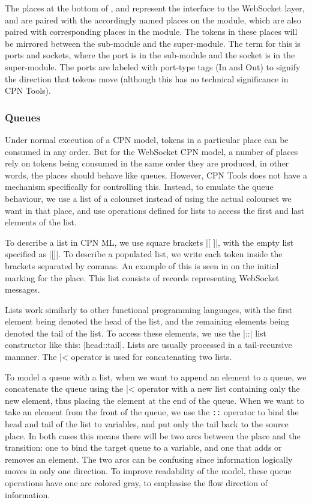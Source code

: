 	The places at the bottom of ,  and
	  represent the interface to the WebSocket layer, and
	are paired with the accordingly named places on the  module,
	which are also paired with corresponding places in the  module. The tokens in these places will be mirrored between the
	sub-module and the super-module. The term for this is ports and sockets,
	where the port is in the sub-module and the socket is in the super-module. The
	ports are labeled with port-type tags (In and Out) to signify the direction
	that tokens move (although this has no technical significance in CPN Tools).
	
	
	\subsubsection{Queues}
	
		Under normal execution of a CPN model, tokens in a particular place can be
		consumed in any order. But for the WebSocket CPN model, a number of places
		rely on tokens being consumed in the same order they are produced,
		in other words, the places should behave like queues. 
		However, CPN Tools does not have a mechanism specifically for controlling
		this.
		Instead, to emulate the queue behaviour, we use a list of a colourset
		instead of using the actual colourset we want in that place, and use
		operations defined for lists to access the first and last elements of the
		list. 
		
		To describe a list in CPN ML, we use square brackets |[ ]|, with the empty
		list specified as |[]|. To describe a populated list, we write each token
		inside the brackets separated by commas. An example of this is seen in
		 on the initial marking for the 
		place. This list consists of records representing WebSocket messages.
		
		Lists work similarly to other functional programming languages, with the
		first element being denoted the head of the list, and the remaining elements
		being denoted the tail of the list. To access these elements, we use the |::|
		list constructor like this: |head::tail|. Lists are usually processed in a
		tail-recursive mannner. The |^^| operator is used for concatenating two lists.
		
		To model a queue with a list, when we want to append an
		element to a queue, we concatenate the queue using the |^^| operator with a
		new list containing only the new element, thus placing the element at the end
		of the queue. When we want to take an element from the front of the queue, we
		use the \lstinline-::- operator to bind the head and tail of the list to
		variables, and put only the tail back to the source place. In both cases this
		means there will be two arcs between the place and the transition: one to
		bind the target queue to a variable, and one that adds or removes an element.
		The two arcs can be confusing since information logically moves in only one
		direction. To improve readability of the model, these queue operations have
		one arc colored gray, to emphasise the flow direction of information.
		
